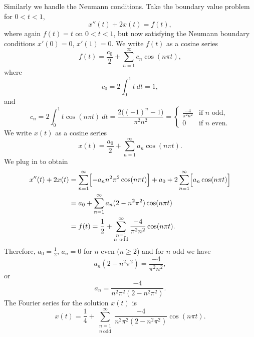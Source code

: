 \begin{example}
Similarly we handle the Neumann conditions.
Take the boundary value problem for $0 < t < 1$,
\begin{equation*}
x''(t) + 2 x(t) = f(t) ,
\end{equation*}
where again $f(t) = t$ on $0 < t < 1$, but now satisfying
the Neumann boundary conditions
$x'(0) = 0$, $x'(1)=0$.
We write $f(t)$ as a cosine series
\begin{equation*}
f(t) = \frac{c_0}{2} + \sum_{n=1}^\infty c_n \cos (n \pi t) ,
\end{equation*}
where
\begin{equation*}
c_0 = 2 \int_0^1 t ~dt = 1 ,
\end{equation*}
and
\begin{equation*}
c_n = 2 \int_0^1 t \cos (n \pi t) ~dt =
\frac{2\bigl({(-1)}^n-1\bigr)}{\pi^2 n^2} = 
\begin{cases}
\frac{-4}{\pi^2 n^2} & \text{if } n \text{ odd} , \\
0 & \text{if } n \text{ even}.
\end{cases}
\end{equation*}
We write $x(t)$ as a cosine series
\begin{equation*}
x(t) = \frac{a_0}{2} + \sum_{n=1}^\infty a_n \cos (n \pi t) .
\end{equation*}
We plug in to obtain 
\begin{equation*}
\begin{split}
x''(t) + 2 x(t) & =
\sum_{n=1}^\infty \Bigl[ - a_n n^2 \pi^2 \cos (n \pi t) \Bigr]
+
a_0 +
2
\sum_{n=1}^\infty \Bigl[ a_n \cos (n \pi t) \Bigr]
\\
& =
a_0 +
\sum_{n=1}^\infty a_n (2 - n^2 \pi^2 ) \cos (n \pi t)
\\
& = f(t)
=
\frac{1}{2} +
\sum_{\substack{n=1\\n~\text{odd}}}^\infty
\frac{-4}{\pi^2 n^2} \cos (n \pi t) .
\end{split}
\end{equation*}
Therefore, $a_0 = \frac{1}{2}$, $a_n = 0$ for $n$ even ($n \geq 2$) and for
$n$ odd we have
\begin{equation*}
a_n (2 - n^2 \pi^2)
=
\frac{-4}{\pi^2 n^2} ,
\end{equation*}
or
\begin{equation*}
a_n
=
\frac{-4}{n^2 \pi^2 (2 - n^2 \pi^2)} .
\end{equation*}
The Fourier series for the solution $x(t)$ is
\begin{equation*}
x(t) = 
\frac{1}{4} +
\sum_{\substack{n=1\\n~\text{odd}}}^\infty
\frac{-4}{n^2 \pi^2 (2 - n^2 \pi^2)} 
\cos (n \pi t) .
\end{equation*}
\end{example}

